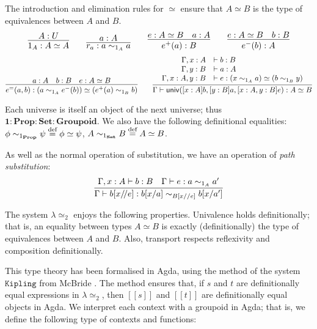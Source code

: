 \documentclass{easychair}
\newcommand{\Prop}{\ensuremath{\mathbf{Prop}}}
\newcommand{\Set}{\ensuremath{\mathbf{Set}}}
\newcommand{\Groupoid}{\ensuremath{\mathbf{Groupoid}}}
\newcommand{\LEtwo}{\ensuremath{\lambda \! \! \simeq_2}}
\newcommand{\eqdef}{\mathrel{\smash{\stackrel{\text{def}}{=}}}}
\newcommand{\brackets}[1]{\ensuremath{[ \! [ {#1} ] \! ]}}
\begin{document}
The introduction and elimination rules for $\simeq$ ensure that $A \simeq B$ is the type of equivalences between $A$ and $B$.
\[ \infer{1_A : A \simeq A}{A : U} \qquad \infer{r_a : a \sim_{1_A} a}{a : A} \qquad \infer{e^+(a) : B}{e : A \simeq B \quad a : A} \qquad \infer{e^-(b) : A}{e : A \simeq B \quad b : B} \]
\[ \infer{e^=(a,b) : (a \sim_{1_A} e^-(b)) \simeq (e^+(a) \sim_{1_B} b)}{a : A \quad b : B \quad e : A \simeq B} \qquad
\infer{\Gamma \vdash \mathsf{univ}([x : A] b, [y : B] a, [x : A, y : B]e) : A \simeq B}{\begin{array}{rl}
\Gamma, x : A & \vdash b : B \\
\Gamma, y : B & \vdash a : A \\
\Gamma, x : A, y : B & \vdash e : (x \sim_{1_A} a) \simeq (b \sim_{1_B} y)
\end{array}} \]

Each universe is itself an object of the next universe; thus $\mathbf{1} : \Prop : \Set : \Groupoid$.  We also have the following definitional equalities:
$\phi \sim_{1_\Prop} \psi \eqdef \phi \simeq \psi$, 
$A \sim_{1_\Set} B \eqdef A \simeq B$.

As well as the normal operation of substitution, we have an operation of \emph{path substitution}:
\[ \infer{\Gamma \vdash b [x / \! / e] : b [x/a] \sim_{B[x//e]} b[x/a']}{\Gamma, x : A \vdash b : B \quad \Gamma \vdash e : a \sim_{1_A} a'} \]

The system $\LEtwo$ enjoys the following properties.  Univalence holds definitionally; that is, an equality between types $A \simeq B$ is exactly (definitionally) the type of equivalences between $A$ and $B$.  Also, transport respects reflexivity and composition definitionally.

This type theory has been formalised in Agda, using the method of the system $\mathtt{Kipling}$ from McBride \cite{McBridea}.  The method ensures that, if $s$ and $t$ are definitionally equal expressions in $\lambda \simeq_2$, then $\brackets{s}$ and $\brackets{t}$ are definitionally equal objects in Agda.  We interpret each context with a groupoid in Agda; that is, we define
the following type of contexts and functions:
\end{document}

